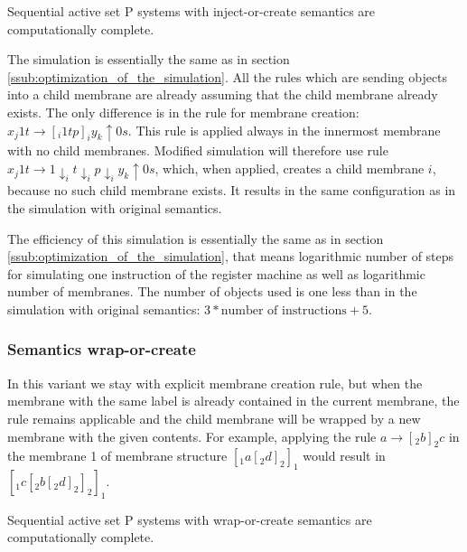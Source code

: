 
    \begin{veta}
      Sequential active set P systems with inject-or-create semantics are computationally complete.
    \end{veta}

    \begin{dokaz}
      The simulation is essentially the same as in section \ref{ssub:optimization_of_the_simulation}. All the rules which are sending objects into a child membrane are already assuming that the child membrane already exists. The only difference is in the rule for membrane creation: $x_j1t \rightarrow [_i 1tp]_iy_k\uparrow 0s$. This rule is applied always in the innermost membrane with no child membranes. Modified simulation will therefore use rule $x_j1t \rightarrow 1\downarrow_i t\downarrow_i p\downarrow_i y_k\uparrow 0s$, which, when applied, creates a child membrane $i$, because no such child membrane exists. It results in the same configuration as in the simulation with original semantics. 
    \end{dokaz}

    The efficiency of this simulation is essentially the same as in section \ref{ssub:optimization_of_the_simulation}, that means logarithmic number of steps for simulating one instruction of the register machine as well as logarithmic number of membranes. The number of objects used is one less than in the simulation with original semantics: $3 * \text{number of instructions} + 5$.


  \subsubsection{Semantics wrap-or-create} %
  \label{ssub:semantics_wrap_or_create}
    
    In this variant we stay with explicit membrane creation rule, but when the membrane with the same label is already contained in the current membrane, the rule remains applicable and the child membrane will be wrapped by a new membrane with the given contents. For example, applying the rule $a \rightarrow [_2 b ]_2 c$ in the membrane 1 of membrane structure $[_1 a [_2 d ]_2 ]_1$ would result in $[_1 c [_2 b [_2 d ]_2 ]_2 ]_1$.


    \begin{veta}
      Sequential active set P systems with wrap-or-create semantics are computationally complete.
    \end{veta}


